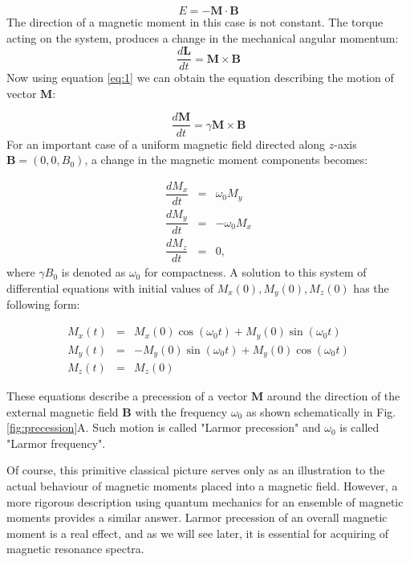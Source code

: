 \documentclass[a4paper, 12pt]{article}
\begin{document}
\begin{equation} \label{eq:2}
E = -\bm{M} \cdot \bm{B}
\end{equation}
The direction of a magnetic moment in this case is not constant. The torque acting on the system, produces a change in the mechanical angular momentum:
\begin{equation}
\frac{d\bm{L}}{dt} = \bm{M} \times \bm{B}
\end{equation}
Now using equation \ref{eq:1} we can obtain the equation describing the motion of vector $\bm{M}$:

\begin{equation} \label{eq:precession_compact}
\frac{d\bm{M}}{dt} = \gamma \bm{M} \times \bm{B}
\end{equation}
For an important case of a uniform magnetic field directed along $z$-axis $\bm{B} = (0, 0, B_0)$, a change in the magnetic moment components becomes:

\begin{equation} \label{precession}
\begin{array}{lcl}
\dfrac{dM_x}{dt} & = & \omega_0 M_y \\
\dfrac{dM_y}{dt} & = & -\omega_0 M_x \\
\dfrac{dM_z}{dt} & = & 0,
\end{array}
\end{equation}
where $\gamma B_0$ is denoted as $\omega_0$ for compactness.
A solution to this system of differential equations with initial values of $M_x(0), M_y(0), M_z(0)$ has the following form:

\begin{equation} 
\begin{array}{lcl}
M_x(t) &=& M_x(0) \cos(\omega_0 t) + M_y(0) \sin (\omega_0 t) \\
M_y(t) &=& -M_y(0) \sin(\omega_0 t) + M_y(0) \cos (\omega_0 t) \\
M_z(t) &=& M_z(0) 
\end{array}
\end{equation}

These equations describe a precession of a vector $\bm{M}$ around the direction of the external magnetic field $\bm{B}$ with the frequency $\omega_0$ as shown schematically in Fig.\ref{fig:precession}A. Such motion is called  "Larmor precession" and $\omega_0$ is called "Larmor frequency".

Of course, this primitive classical picture serves only as an illustration to the actual behaviour of magnetic moments placed into a magnetic field. However, a more rigorous description using quantum mechanics for an ensemble of magnetic moments provides a similar answer. Larmor precession of an overall magnetic moment is a real effect, and as we will see later, it is essential for acquiring of magnetic resonance spectra.
\end{document}

